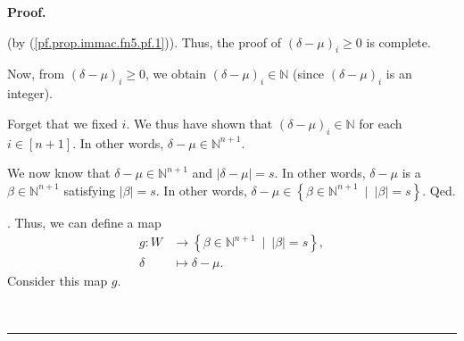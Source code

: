 \documentclass
[numbers=enddot,12pt,final,onecolumn,notitlepage,english]{scrartcl}%
\theoremstyle{definition}
\newenvironment{proof}[1][Proof]{\noindent\textbf{#1.} }{\ \rule{0.5em}{0.5em}}
\newenvironment{verlong}{}{}
\begin{document}
\begin{proof}
\begin{verlong}
{\[\]
(by (\ref{pf.prop.immac.fn5.pf.1})). Thus, the proof of $\left(  \delta
-\mu\right)  _{i}\geq0$ is complete.
\par
Now, from $\left(  \delta-\mu\right)  _{i}\geq0$, we obtain $\left(
\delta-\mu\right)  _{i}\in\mathbb{N}$ (since $\left(  \delta-\mu\right)  _{i}$
is an integer).
\par
Forget that we fixed $i$. We thus have shown that $\left(  \delta-\mu\right)
_{i}\in\mathbb{N}$ for each $i\in\left[  n+1\right]  $. In other words,
$\delta-\mu\in\mathbb{N}^{n+1}$.
\par
We now know that $\delta-\mu\in\mathbb{N}^{n+1}$ and $\left\vert \delta
-\mu\right\vert =s$. In other words, $\delta-\mu$ is a $\beta\in
\mathbb{N}^{n+1}$ satisfying $\left\vert \beta\right\vert =s$. In other words,
$\delta-\mu\in\left\{  \beta\in\mathbb{N}^{n+1}\ \mid\ \left\vert
\beta\right\vert =s\right\}  $. Qed.}. Thus, we can define a map%
\begin{align*}
g:W  &  \rightarrow\left\{  \beta\in\mathbb{N}^{n+1}\ \mid\ \left\vert
\beta\right\vert =s\right\}  ,\\
\delta &  \mapsto\delta-\mu.
\end{align*}
Consider this map $g$.


\end{verlong}
\end{proof}
\end{document}
